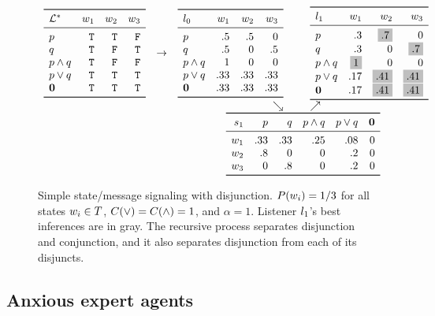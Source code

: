 \documentclass{article}
\begin{document}
\begin{figure}[tp]
  \centering
  \setlength{\arraycolsep}{3pt} 
  $\begin{array}[b]{c c r@{\hspace{25pt}}l}
     \listenerMatrix%
     {\LexStar}%
     {\True & \True  & \False}%
     {\True & \False & \True}%
     {\True & \False & \False}%
     {\True & \True  & \True}%
     {\True & \True  & \True}%
     &
     \rightarrow
     &
     \listenerMatrix%
     {\listenerZero}%
     { .5 &  .5 &   0}%
     { .5 &   0 &  .5}%
     {1   &   0 &   0}%
     {.33 & .33 & .33}%
     {.33 & .33 & .33}%
     &
     \listenerMatrix%
     {\listenerOne}%
     { .3 & \graycell{.7} &   0}%
     { .3 &   0 & \graycell{.7}}%
     {\graycell{1} &   0 &   0}%
     { .17 & \graycell{.41} & \graycell{.41}}%
     { .17 & \graycell{.41} & \graycell{.41}}%
   \\
   && \searrow & \nearrow
   \\
   &&
   \multicolumn{2}{c}{
      \speakerMatrix%
      {\speakerOne}%
      {.33 & .33 & .25 & .08 & 0}%
      {.8 & 0   &   0 & .2 & 0}%
      {  0 & .8 &   0 & .2 & 0}%
   }
   \end{array}$   
   \caption{Simple state/message signaling with disjunction. 
     $P(w_{i}) = 1/3$ for all states $w_{i} \in T$,
     $C(\vee) = C(\wedge) = 1$, and 
     $\alpha = 1$. 
     Listener $l_{1}$'s best inferences are in gray. 
     The recursive process separates disjunction and conjunction, and 
     it also separates disjunction from each of its disjuncts.}
  \label{fig:rsa-disj}
\end{figure}


\subsection{Anxious expert agents}\label{sec:full}
\end{document}
